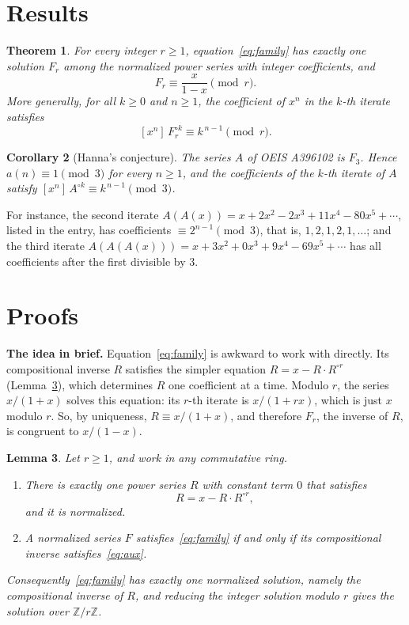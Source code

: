 \documentclass[11pt,a4paper]{article}
\newtheorem{theorem}{Theorem}[section]
\newtheorem{lemma}[theorem]{Lemma}
\newtheorem{corollary}[theorem]{Corollary}
\theoremstyle{definition}
\theoremstyle{remark}
\newcommand{\Z}{\mathbb{Z}}
\newcommand{\coeff}[2]{[x^{#1}]\,#2}
\newcommand{\para}[1]{\par\medskip\noindent\textbf{#1}\enspace}
\begin{document}
\section{Results}\label{sec:results}

\begin{theorem}\label{thm:main}
For every integer $r\ge1$, equation~\eqref{eq:family} has exactly one solution $F_r$ among the normalized power series
with integer coefficients, and
\[
F_r\equiv\frac{x}{1-x}\pmod r .
\]
More generally, for all $k\ge0$ and $n\ge1$, the coefficient of $x^n$ in the $k$-th iterate satisfies
\[
\coeff{n}{F_r^{\circ k}}\equiv k^{\,n-1}\pmod r .
\]
\end{theorem}

\begin{corollary}[Hanna's conjecture]\label{cor:conj}
The series $A$ of OEIS A396102 is $F_3$. Hence $a(n)\equiv1\pmod3$ for every $n\ge1$, and the coefficients of
the $k$-th iterate of $A$ satisfy $\coeff{n}{A^{\circ k}}\equiv k^{\,n-1}\pmod3$.
\end{corollary}

For instance, the second iterate $A(A(x))=x+2x^2-2x^3+11x^4-80x^5+\cdots$, listed in the entry, has coefficients
$\equiv2^{n-1}\pmod3$, that is, $1,2,1,2,1,\dots$; and the third iterate $A(A(A(x)))=x+3x^2+0x^3+9x^4-69x^5+\cdots$ has
all coefficients after the first divisible by $3$.

\section{Proofs}\label{sec:proofs}

\para{The idea in brief.} Equation~\eqref{eq:family} is awkward to work with directly. Its compositional inverse $R$
satisfies the simpler equation $R=x-R\cdot R^{\circ r}$ (Lemma~\ref{lem:aux}), which determines $R$ one coefficient at
a time. Modulo $r$, the series $x/(1+x)$ solves this equation: its $r$-th iterate is $x/(1+rx)$, which is just $x$
modulo $r$. So, by uniqueness, $R\equiv x/(1+x)$, and therefore $F_r$, the inverse of $R$, is congruent to $x/(1-x)$.

\begin{lemma}\label{lem:aux}
Let $r\ge1$, and work in any commutative ring.
\begin{enumerate}[label=(\alph*)]
\item There is exactly one power series $R$ with constant term $0$ that satisfies
\begin{equation}\label{eq:aux}
R=x-R\cdot R^{\circ r},
\end{equation}
and it is normalized.
\item A normalized series $F$ satisfies~\eqref{eq:family} if and only if its compositional inverse satisfies~\eqref{eq:aux}.
\end{enumerate}
Consequently~\eqref{eq:family} has exactly one normalized solution, namely the compositional inverse of $R$, and
reducing the integer solution modulo $r$ gives the solution over $\Z/r\Z$.
\end{lemma}
\end{document}
